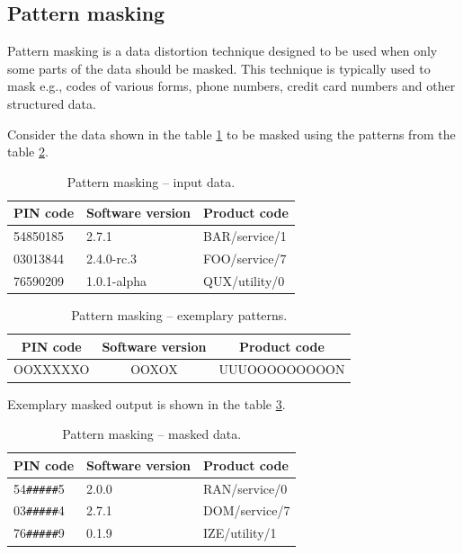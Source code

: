 \documentclass[a4paper,twoside,12pt]{book}
\begin{document}
\subsection{Pattern masking}

Pattern masking is a data distortion technique designed to be used when only some parts of the data should be masked. This technique is typically used to mask e.g., codes of various forms, phone numbers, credit card numbers and other structured data. 

Consider the data shown in the table \ref{id:tab:pattern_masking_raw} to be masked using the patterns from the table \ref{id:tab:pattern_masking_patterns}.

\begin{table}[h]
\centering
\caption{Pattern masking – input data.}
\label{id:tab:pattern_masking_raw}
\begin{tabular}{lll}
\toprule
PIN code & Software version & Product code  \\ \midrule
54850185 & 2.7.1            & BAR/service/1 \\
03013844 & 2.4.0-rc.3       & FOO/service/7 \\
76590209 & 1.0.1-alpha      & QUX/utility/0 \\ \bottomrule
\end{tabular}
\end{table}

\begin{table}[h]
\centering
\caption{Pattern masking – exemplary patterns.}
\label{id:tab:pattern_masking_patterns}
\begin{tabular}{ccc}
\toprule
PIN code & Software version & Product code  \\ \midrule
OOXXXXXO & OOXOX            & UUUOOOOOOOOON \\ \bottomrule
\end{tabular}
\end{table}

Exemplary masked output is shown in the table \ref{id:tab:pattern_masking_masked}.

\begin{table}[h]
\centering
\caption{Pattern masking – masked data.}
\label{id:tab:pattern_masking_masked}
\begin{tabular}{lll}
\toprule
PIN code & Software version & Product code  \\ \midrule
54\verb|#####|5 & 2.0.0 & RAN/service/0 \\
03\verb|#####|4 & 2.7.1 & DOM/service/7 \\
76\verb|#####|9 & 0.1.9 & IZE/utility/1 \\ \bottomrule
\end{tabular}
\end{table}
\end{document}
